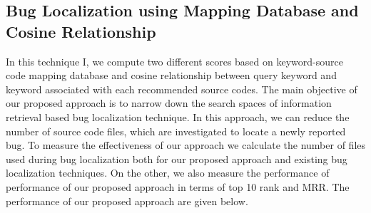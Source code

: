 \documentclass{sig-alternate}
\begin{document}
\subsection{Bug Localization using Mapping Database and Cosine Relationship}
In this technique I, we compute two different scores based on keyword-source code mapping database and cosine relationship between query keyword and keyword associated with each recommended source codes. The main objective of our proposed approach is to narrow down the search spaces of information retrieval based bug localization technique. In this approach, we can reduce the number of source code files, which are investigated to locate a newly reported bug. To measure the effectiveness of our approach we calculate the number of files used during bug localization both for our proposed approach and existing bug localization techniques. On the other, we also measure the performance of performance of our proposed approach in terms of top 10 rank and MRR. The performance of our proposed approach are given below.
\end{document}
